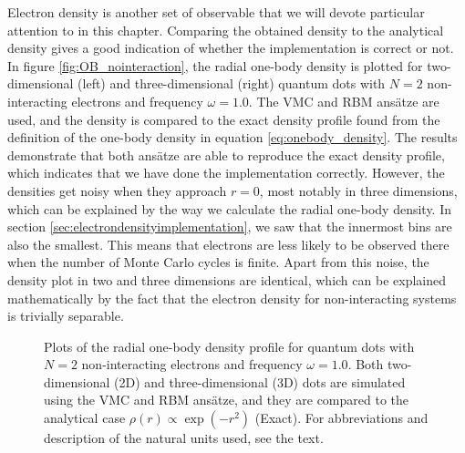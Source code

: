 Electron density is another set of observable that we will devote particular attention to in this chapter. Comparing the obtained density to the analytical density gives a good indication of whether the implementation is correct or not. In figure \eqref{fig:OB_nointeraction}, the radial one-body density is plotted for two-dimensional (left) and three-dimensional (right) quantum dots with $N=2$ non-interacting electrons and frequency $\omega=1.0$. The VMC and RBM ansätze are used, and the density is compared to the exact density profile found from the definition of the one-body density in equation \ref{eq:onebody_density}. The results demonstrate that both ansätze are able to reproduce the exact density profile, which indicates that we have done the implementation correctly. However, the densities get noisy when they approach $r=0$, most notably in three dimensions, which can be explained by the way we calculate the radial one-body density. In section \ref{sec:electrondensityimplementation}, we saw that the innermost bins are also the smallest. This means that electrons are less likely to be observed there when the number of Monte Carlo cycles is finite. Apart from this noise, the density plot in two and three dimensions are identical, which can be explained mathematically by the fact that the electron density for non-interacting systems is trivially separable.

\begin{figure}
	\centering
	\captionsetup[subfigure]{labelformat=empty}
	\caption{Plots of the radial one-body density profile for quantum dots with $N=2$ non-interacting electrons and frequency $\omega=1.0$. Both two-dimensional (2D) and three-dimensional (3D) dots are simulated using the VMC and RBM ansätze, and they are compared to the analytical case $\rho(r)\propto\exp(-r^2)$ (Exact). For abbreviations and description of the natural units used, see the text.}
	\label{fig:OB_nointeraction}
\end{figure}

